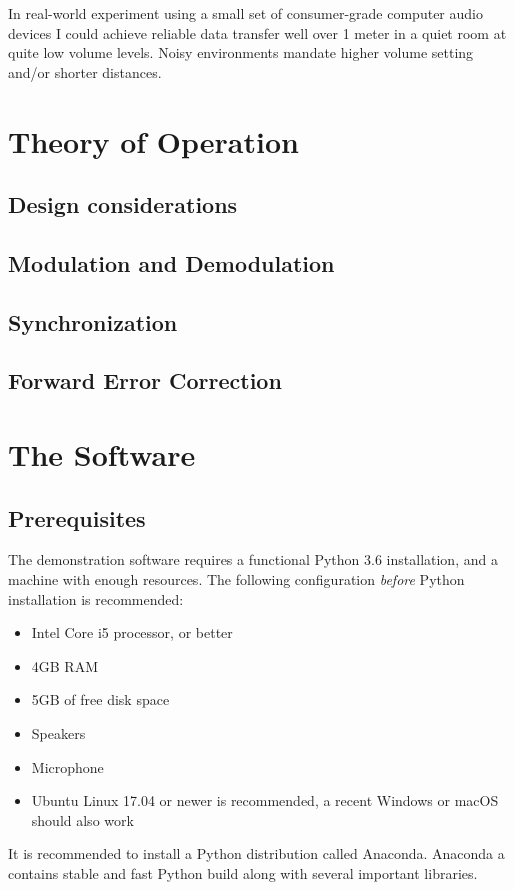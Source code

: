 \documentclass[a4paper]{article}
\begin{document}
In real-world experiment using a small set of consumer-grade computer 
audio devices I could achieve reliable data transfer well over 1 meter 
in a quiet room at quite low volume levels. Noisy environments mandate 
higher volume setting and/or shorter distances. \section{Theory of 
Operation} \subsection{Design considerations} \subsection{Modulation 
and Demodulation} \subsection{Synchronization} \subsection{Forward 
Error Correction} \section{The Software} \label{sec:thesoftware}

\subsection{Prerequisites}

The demonstration software requires a functional Python 3.6 
installation, and a machine with enough resources. The following 
configuration \textit{before} Python installation is recommended:

\begin{itemize}
\item Intel Core i5 processor, or better
\item 4GB RAM
\item 5GB of free disk space
\item Speakers
\item Microphone
\item Ubuntu Linux 17.04 or newer is recommended, a recent Windows or
macOS should also work
\end{itemize}

It is recommended to install a Python distribution called 
Anaconda\cite{ana1}. Anaconda a contains stable and fast Python build 
along with several important libraries.
\end{document}
